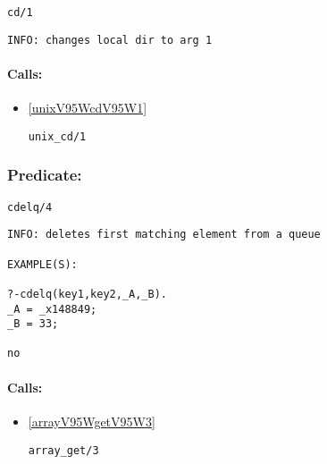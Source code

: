 \begin{verbatim}
cd/1
\end{verbatim}

{\small \begin{verbatim}
INFO: changes local dir to arg 1

\end{verbatim}}
\paragraph{Calls:} 
\begin{itemize}
\item \ref{unixV95WcdV95W1} 
\begin{verbatim}
unix_cd/1
\end{verbatim}

\end{itemize}

\subsubsection{Predicate:} \label{cdelqV95W4}

\begin{verbatim}
cdelq/4
\end{verbatim}

{\small \begin{verbatim}
INFO: deletes first matching element from a queue

EXAMPLE(S):

?-cdelq(key1,key2,_A,_B).
_A = _x148849;
_B = 33;

no

\end{verbatim}}
\paragraph{Calls:} 
\begin{itemize}
\item \ref{arrayV95WgetV95W3} 
\begin{verbatim}
array_get/3
\end{verbatim}

\end{itemize}
